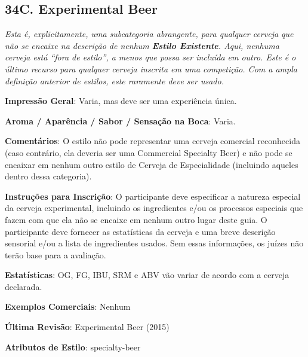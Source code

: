 \subsection*{34C. Experimental Beer}

\textit{Esta é, explicitamente, uma subcategoria abrangente, para qualquer cerveja que não se encaixe na descrição de nenhum \textbf{Estilo Existente}. Aqui, nenhuma cerveja está “fora de estilo”, a menos que possa ser incluída em outro. Este é o último recurso para qualquer cerveja inscrita em uma competição. Com a ampla definição anterior de estilos, este raramente deve ser usado.}

\textbf{Impressão Geral}: Varia, mas deve ser uma experiência única.

\textbf{Aroma / Aparência / Sabor / Sensação na Boca}: Varia.

\textbf{Comentários}: O estilo não pode representar uma cerveja comercial reconhecida (caso contrário, ela deveria ser uma Commercial Specialty Beer) e não pode se encaixar em nenhum outro estilo de Cerveja de Especialidade (incluindo aqueles dentro dessa categoria).

\textbf{Instruções para Inscrição}: O participante deve especificar a natureza especial da cerveja experimental, incluindo os ingredientes e/ou os processos especiais que fazem com que ela não se encaixe em nenhum outro lugar deste guia. O participante deve fornecer as estatísticas da cerveja e uma breve descrição sensorial e/ou a lista de ingredientes usados. Sem essas informações, os juízes não terão base para a avaliação.

\textbf{Estatísticas}: OG, FG, IBU, SRM e ABV vão variar de acordo com a cerveja declarada.

\textbf{Exemplos Comerciais}: Nenhum

\textbf{Última Revisão}: Experimental Beer (2015)

\textbf{Atributos de Estilo}: specialty-beer
